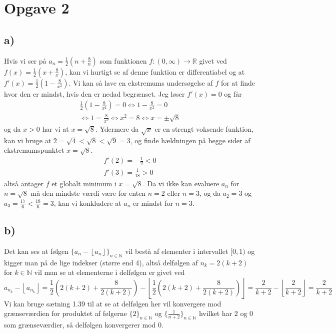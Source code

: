 \documentclass{article}
\newcommand{\m}[1]{\mathbb{#1}}
\newcommand{\mR}{\m{R}}
\newcommand{\mN}{\m{N}}
\newcommand{\floor}[1]{\left\lfloor #1\right\rfloor}
\begin{document}
\section*{Opgave 2}
\subsection*{a)}
Hvis vi ser på $a_n = \frac{1}{2}(n + \frac{8}{n})$ som funktionen $f: (0, \infty) \to \mR$ givet ved $f(x) = \frac{1}{2}(x + \frac{8}{x})$, 
kan vi hurtigt se af denne funktion er differentiabel og at $f'(x) = \frac{1}{2}(1 - \frac{8}{x^2})$. 
Vi kan så lave en ekstremums undersøgelse af $f$ for at finde hvor den er mindst, hvis den er nedad begrænset.
Jeg løser $f'(x) = 0$ og får
\begin{align*}
    \frac{1}{2}(1 - \frac{8}{x^2}) = 0 \iff 1 - \frac{8}{x^2} = 0 \\
    \iff 1 = \frac{8}{x^2} \iff x^2 = 8 \iff x = \pm \sqrt{8}
\end{align*}
og da $x > 0$ har vi at $x = \sqrt{8}$. Ydermere da $\sqrt{x}$ er en strengt voksende funktion, 
kan vi bruge at $2 = \sqrt{4} < \sqrt{8} < \sqrt{9} = 3$, 
og finde hældningen på begge sider af ekstremumspunktet $x = \sqrt{8}$.
\begin{align*}
    f'(2) = -\frac{1}{2} < 0 \\
    f'(3) = \frac{1}{18} > 0
\end{align*}
altså antager $f$ et globalt minimum i $x = \sqrt{8}$.
Da vi ikke kan evaluere $a_n$ for $n=\sqrt{8}$ må den mindste værdi være for enten $n = 2$ eller $n = 3$, og da $a_2 = 3$ og $a_3 = \frac{17}{6} < \frac{18}{6} = 3$,
kan vi konkludere at $a_n$ er mindst for $n=3$.


\subsection*{b)}
Det kan ses at følgen $\{a_n - \floor{a_n} \}_{n \in \mN}$ vil bestå af elementer i intervallet $[0, 1)$ og kigger man på de lige indekser (større end 4),
altså delfølgen af $n_k = 2(k+2)$ for $k \in \mN$ vil man se at elementerne i delfølgen er givet ved 
\[
    a_{n_k} - \floor{a_{n_k}} = \frac{1}{2} (2(k+2) + \frac{8}{2(k+2)}) - \floor{\frac{1}{2} (2(k+2) + \frac{8}{2(k+2)})}= \frac{2}{k+2} - \floor{\frac{2}{k+2}} = \frac{2}{k+2} 
\]
Vi kan bruge sætning 1.39 til at se at delfølgen her vil konvergere mod grænseværdien for produktet af følgerne $\{2\}_{n \in \mN}$ og $\{ \frac{1}{n+2} \}_{n \in \mN}$
hvilket har $2$ og $0$ som grænseværdier, så delfølgen konvergerer mod $0$.
\end{document}
